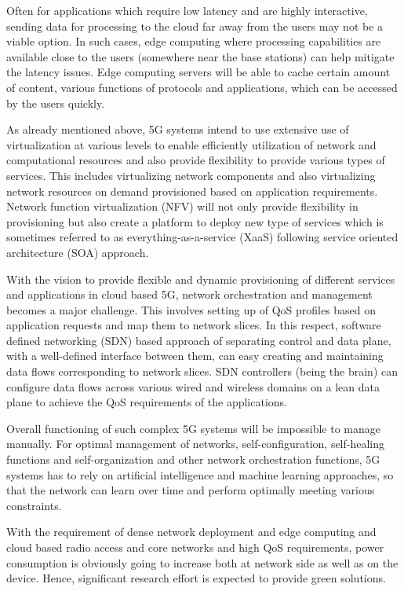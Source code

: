 \begin{multicols}{2}
Often for applications which require low latency and are highly interactive, sending data for processing to the cloud far away from the users may not be a viable option. In such cases, edge computing where processing capabilities are available close to the users (somewhere near the base stations) can help mitigate the latency issues. Edge computing servers will be able to cache certain amount of content, various functions of protocols and applications, which can be accessed by the users quickly. 

As already mentioned above, 5G systems intend to use extensive use of virtualization at various levels to enable efficiently utilization of network and computational resources and also provide flexibility to provide various types of services. This includes virtualizing network components and also virtualizing network resources on demand provisioned based on application requirements. Network function virtualization (NFV) will not only provide flexibility in provisioning but also create a platform to deploy new type of services which is sometimes referred to as everything-as-a-service (XaaS) following service oriented architecture (SOA) approach.

With the vision to provide flexible and dynamic provisioning of different services and applications in cloud based 5G, network orchestration and management becomes a major challenge. This involves setting up of QoS profiles based on application requests and map them to network slices. In this respect, software defined networking (SDN) based approach of separating control and data plane, with a well-defined interface between them, can easy creating and maintaining data flows corresponding to network slices. SDN controllers (being the brain) can configure data flows across various wired and wireless domains on a lean data plane to achieve the QoS requirements of the applications. 

Overall functioning of such complex 5G systems will be impossible to manage manually. For optimal management of networks, self-configuration, self-healing functions and self-organization and other network orchestration functions, 5G systems has to rely on artificial intelligence and machine learning approaches, so that the network can learn over time and perform optimally meeting various constraints.

With the requirement of dense network deployment and edge computing and cloud based radio access and core networks and high QoS requirements, power consumption is obviously going to increase both at network side as well as on the device. Hence, significant research effort is expected to provide green solutions.


\end{multicols}
